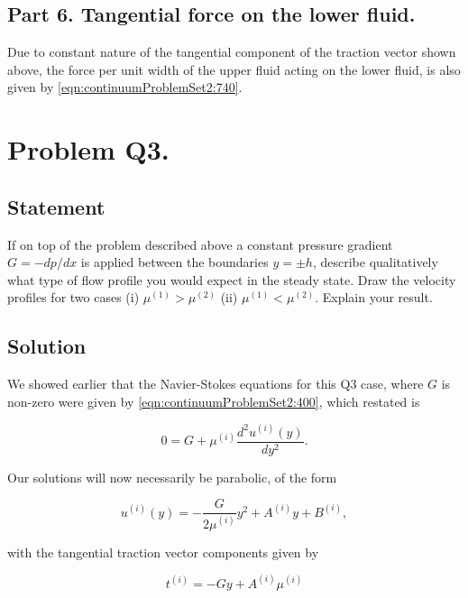 \subsection{Part 6.  Tangential force on the lower fluid.}

Due to constant nature of the tangential component of the traction vector shown above, the force per unit width of the upper fluid acting on the lower fluid, is also given by \ref{eqn:continuumProblemSet2:740}.

\section{Problem Q3.}
\subsection{Statement}

If on top of the problem described above a constant pressure gradient $G = -dp/dx$ is applied between the boundaries $y = \pm h$, describe qualitatively what type of flow profile you would expect in the steady state.  Draw the velocity profiles for two cases (i) $\mu^{(1)} > \mu^{(2)}$ (ii) $\mu^{(1)} < \mu^{(2)}$.  Explain your result.

\subsection{Solution}

We showed earlier that the Navier-Stokes equations for this Q3 case, where $G$ is non-zero were given by \ref{eqn:continuumProblemSet2:400}, which restated is

\begin{equation}\label{eqn:continuumProblemSet2:400b}
0 = G + \mu^{(i)} \frac{d^2 u^{(i)}(y)}{dy^2}.
\end{equation}

Our solutions will now necessarily be parabolic, of the form

\begin{equation}\label{eqn:continuumProblemSet2:760}
u^{(i)}(y) = -\frac{G}{2 \mu^{(i)}} y^2 + A^{(i)} y + B^{(i)},
\end{equation}

with the tangential traction vector components given by

\begin{equation}\label{eqn:continuumProblemSet2:780}
t^{(i)} = -G y + A^{(i)} \mu^{(i)}
\end{equation}

